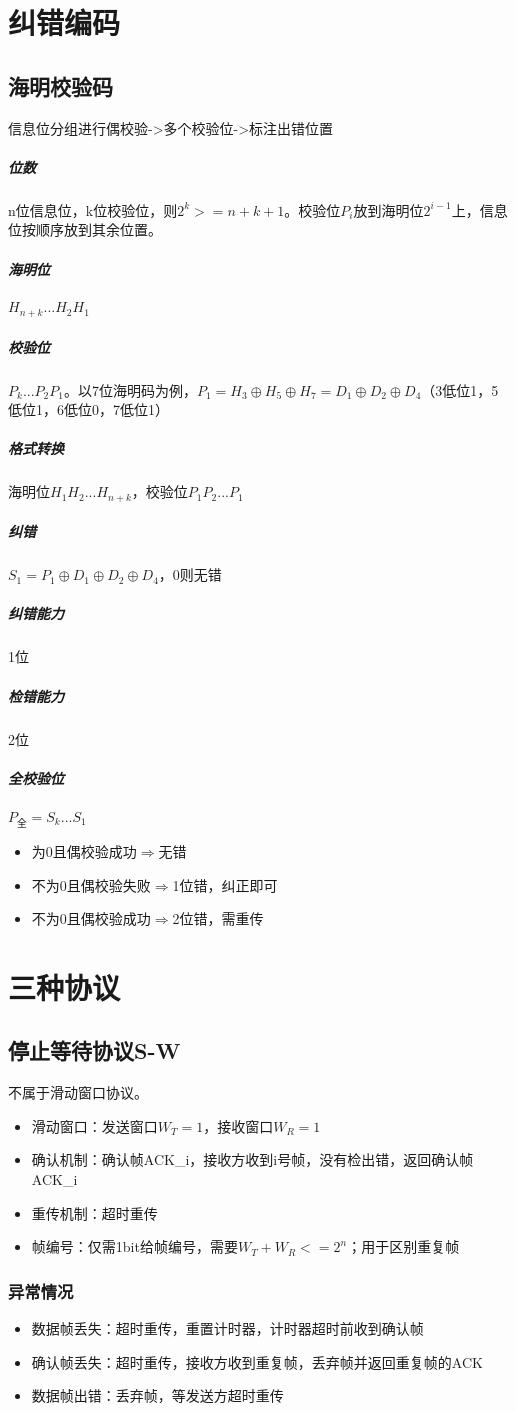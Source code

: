 \section{纠错编码}\label{纠错编码}

\subsection{海明校验码}
信息位分组进行偶校验->多个校验位->标注出错位置
\subparagraph{位数}
n位信息位，k位校验位，则\(2^k >= n + k + 1\)。校验位\(P_i\)放到海明位\(2^{i - 1}\)上，信息位按顺序放到其余位置。
\subparagraph{海明位}
\(H_{n + k} ...H_2 H_1\)
\subparagraph{校验位}
\(P_k...P_2P_1\)。以7位海明码为例，\(P_1 = H_3 \oplus H_5 \oplus H_7 = D_1 \oplus D_2 \oplus D_4\)（3低位1，5低位1，6低位0，7低位1）
\subparagraph{格式转换}
海明位\(H_1H_2...H_{n + k}\)，校验位\(P_1P_2...P_1\)
\subparagraph{纠错}
\(S_1 = P_1 \oplus D_1 \oplus D_2 \oplus D_4\)，0则无错
\subparagraph{纠错能力}
1位
\subparagraph{检错能力}
2位

\subparagraph{全校验位}
\(P_{\text{全}} = S_k...S_1\)\begin{itemize}
    \item 为0且偶校验成功\(\Rightarrow\)无错
    \item 不为0且偶校验失败\(\Rightarrow\)1位错，纠正即可
    \item 不为0且偶校验成功\(\Rightarrow\)2位错，需重传
\end{itemize}


\section{三种协议}

\subsection{停止等待协议S-W}
不属于滑动窗口协议。
\begin{itemize}
    \item 滑动窗口：发送窗口\(W_T = 1\)，接收窗口\(W_R = 1\)
    \item 确认机制：确认帧ACK\_i，接收方收到i号帧，没有检出错，返回确认帧ACK\_i
    \item 重传机制：超时重传
    \item 帧编号：仅需1bit给帧编号，需要\(W_T + W_R <= 2^n\)；用于区别重复帧
\end{itemize}

\subsubsection{异常情况}
\begin{itemize}
    \item 数据帧丢失：超时重传，重置计时器，计时器超时前收到确认帧
    \item 确认帧丢失：超时重传，接收方收到重复帧，丢弃帧并返回重复帧的ACK
    \item 数据帧出错：丢弃帧，等发送方超时重传
\end{itemize}


